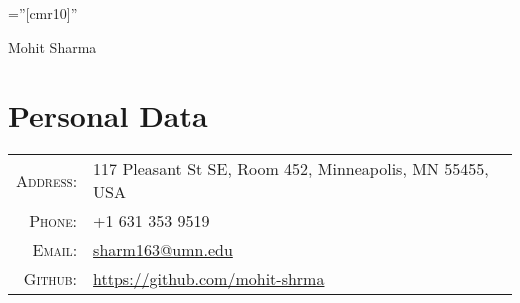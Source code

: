 \documentclass[a4paper,10pt]{article}
\begin{document}

\pagestyle{empty} %

\font\fb=''[cmr10]'' %

\par{\centering
		{\Huge Mohit Sharma
	}\bigskip\par}

\section{Personal Data}

\begin{tabular}{rl}
  \textsc{Address:}   & 117 Pleasant St SE, Room 452, Minneapolis, MN 55455, USA  \\
  \textsc{Phone:}     & +1 631 353 9519\\
  \textsc{Email:}     &
  \href{mailto:sharm163@umn.edu}{sharm163@umn.edu} \\ %
  \textsc{Github:} & \url{https://github.com/mohit-shrma} 
\end{tabular}

\end{document}
